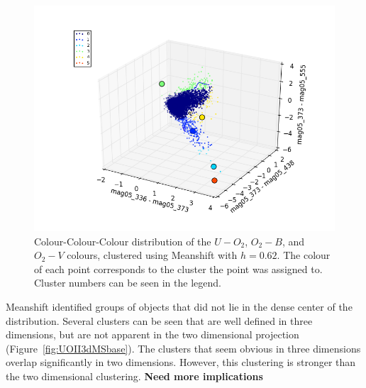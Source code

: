 \begin{figure}
\centering
\includegraphics[width=\linewidth]{figs/successful/meanshift_3d_6cl_mag05_336-mag05_373vsmag05_373-mag05_438vsmag05_373-mag05_555}
\caption{Colour-Colour-Colour distribution of the $U-O_{2}$, $O_{2} - B$, and $O_{2} - V$ colours, clustered using Meanshift with $h=0.62$. The colour of each point corresponds to the cluster the point was assigned to. Cluster numbers can be seen in the legend.}
\label{fig:UOII3dMS6}
\end{figure}

Meanshift identified groups of objects that did not lie in the dense center of the distribution.
Several clusters can be seen that are well defined in three dimensions, but are not apparent in the two dimensional projection (Figure~\ref{fig:UOII3dMSbase}).
The clusters that seem obvious in three dimensions overlap significantly in two dimensions.
However, this clustering is stronger than the two dimensional clustering.
\textbf{Need more implications}

